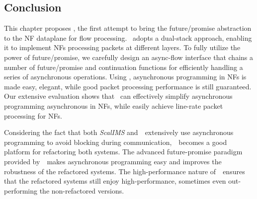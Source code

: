 

\subsection{Conclusion}

This chapter proposes \netstar, the first attempt to bring the future/promise abstraction to the NF dataplane for flow processing.  \netstar~adopts a dual-stack approach, enabling it to implement NFs processing packets at different layers. To fully utilize the power of future/promise, we carefully design an async-flow interface that chains a number of future/promise and continuation functions for efficiently handling a series of asynchronous operations. Using \netstar, asynchronous programming in NFs is made easy, elegant, while good packet processing performance is still guaranteed. Our extensive evaluation shows that \netstar~can effectively simplify asynchronous programming asynchronous in NFs, while easily achieve line-rate packet processing for NFs.

Considering the fact that both \textit{ScalIMS} and~\nfactor~extensively use asynchronous programming to avoid blocking during communication,~\netstar~becomes a good platform for refactoring both systems. The advanced future-promise paradigm provided by~\netstar~makes asynchronous programming easy and improves the robustness of the refactored systems. The high-performance nature of~\netstar~ensures that the refactored systems still enjoy high-performance, sometimes even out-performing the non-refactored versions. 
